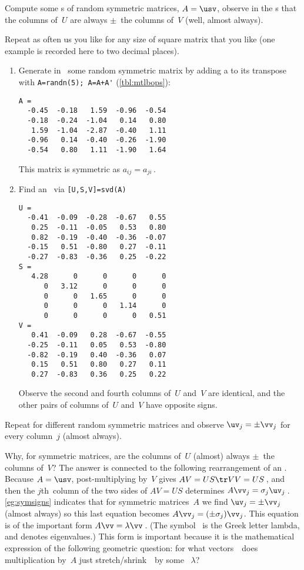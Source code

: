 \begin{example} \label{eg:symsigns}
Compute some \svd{}s of random symmetric matrices, \(A=\usv\), observe in the \svd{}s that the columns of~\(U\) are always \(\pm\)~the columns of~\(V\) (well, almost always).
\begin{solution} 
Repeat as often us you like for any size of square matrix that you like  (one example is recorded here to two decimal places).  
\begin{enumerate}
\item Generate in \script\ some random symmetric matrix by adding a 
 to its transpose with \verb|A=randn(5); A=A+A'| (\cref{tbl:mtlbops}):
\setbox\ajrqrbox\hbox{}%
\marginajrbox%
\begin{verbatim}
A =
  -0.45  -0.18   1.59  -0.96  -0.54
  -0.18  -0.24  -1.04   0.14   0.80
   1.59  -1.04  -2.87  -0.40   1.11
  -0.96   0.14  -0.40  -0.26  -1.90
  -0.54   0.80   1.11  -1.90   1.64
\end{verbatim}
This matrix is symmetric as \(a_{ij}=a_{ji}\)\,.
\item Find an \svd\ via \verb|[U,S,V]=svd(A)| \twodp
\begin{verbatim}
U =
  -0.41  -0.09  -0.28  -0.67   0.55
   0.25  -0.11  -0.05   0.53   0.80
   0.82  -0.19  -0.40  -0.36  -0.07
  -0.15   0.51  -0.80   0.27  -0.11
  -0.27  -0.83  -0.36   0.25  -0.22
S =
   4.28      0      0      0      0
      0   3.12      0      0      0
      0      0   1.65      0      0
      0      0      0   1.14      0
      0      0      0      0   0.51
V =
   0.41  -0.09   0.28  -0.67  -0.55
  -0.25  -0.11   0.05   0.53  -0.80
  -0.82  -0.19   0.40  -0.36   0.07
   0.15   0.51   0.80   0.27   0.11
   0.27  -0.83   0.36   0.25   0.22
\end{verbatim}
Observe the second and fourth columns of~\(U\) and~\(V\) are identical, and the other pairs of columns of~\(U\) and~\(V\) have opposite signs.
\end{enumerate}
Repeat for different random symmetric matrices and observe \(\uv_j=\pm \vv_j\) for every column~\(j\) (almost always).
\end{solution}
\end{example}

Why, for symmetric matrices, are the columns of~\(U\) (almost) always \(\pm\)~the columns of~\(V\)?
The answer is connected to the following rearrangement of an \svd.  
Because \(A=\usv\), post-multiplying by~\(V\) gives \(AV=US\tr VV=US\)\,, and then the \(j\)th~column of the two sides of \(AV=US\) determines \(A\vv_j=\sigma_j\uv_j\)\,.
\cref{eg:symsigns} indicates that for symmetric matrices~\(A\) we  find \(\uv_j=\pm\vv_j\) (almost always) so this last equation becomes \(A\vv_j=(\pm \sigma_j)\vv_j\).
This equation is of the important form \(A\vv=\lambda\vv\)\,.
(The symbol~\bfidx{$\lambda$} is the Greek letter lambda, and denotes eigenvalues.)
This form is important because it is the mathematical expression of the following geometric question: for what vectors~\vv\ does multiplication by~\(A\) just stretch\slash shrink~\vv\ by some ~\(\lambda\)?

